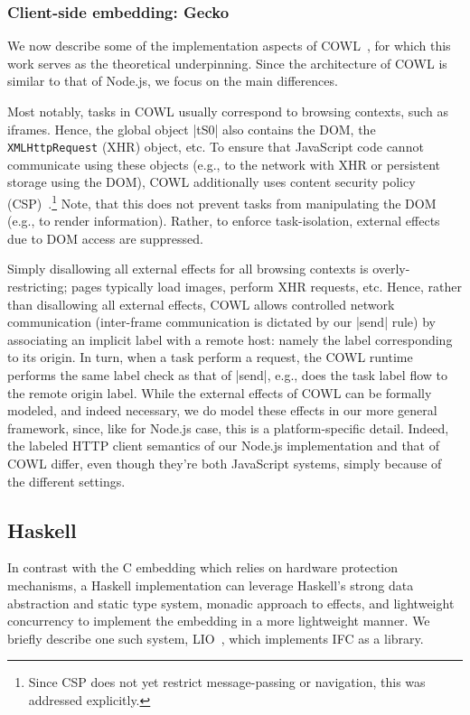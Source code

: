 \subsubsection{Client-side embedding: Gecko}

We now describe some of the implementation aspects of
COWL~\cite{swapi}, for which this work serves as the theoretical
underpinning.
%
Since the architecture of COWL is similar to that of Node.js, we focus
on the main differences.
 
Most notably, tasks in COWL usually correspond to browsing contexts,
such as iframes.
%
Hence, the global object |tS0| also contains the DOM, the
\verb|XMLHttpRequest| (XHR) object, etc.
%
To ensure that JavaScript code cannot communicate using these objects
(e.g., to the network with XHR or persistent storage using the DOM),
COWL additionally uses content security policy (CSP)~\cite{csp1.1}.\footnote{
  Since CSP does not yet restrict message-passing or navigation, this
  was addressed explicitly.
}
%
Note, that this does not prevent tasks from manipulating the DOM
(e.g., to render information).
%
Rather, to enforce task-isolation, external effects due to DOM access
are suppressed.

Simply disallowing all external effects for all browsing contexts is
overly-restricting; pages typically load images, perform XHR requests,
etc.
%
Hence, rather than disallowing all external effects, COWL allows
controlled network communication (inter-frame communication is
dictated by our |send| rule) by associating an implicit label with a
remote host: namely the label corresponding to its origin.
%
In turn, when a task perform a request, the COWL runtime performs the
same label check as that of |send|, e.g., does the task label flow to
the remote origin label.
%
While the external effects of COWL can be formally modeled, and indeed
necessary, we do model these effects in our more general framework,
since, like for Node.js case, this is a platform-specific detail.
%
Indeed, the labeled HTTP client semantics of our Node.js
implementation and that of COWL differ, even though they're both
JavaScript systems, simply because of the different settings.


\subsection{Haskell}
\label{sec:real:hs}
In contrast with the C embedding which relies on hardware protection
mechanisms, a Haskell implementation can leverage Haskell's strong data
abstraction and static type system, monadic approach to effects, and
lightweight concurrency to implement the embedding in a more lightweight
manner.  We briefly describe one such system, LIO~\cite{lio}, which
implements IFC as a library.

